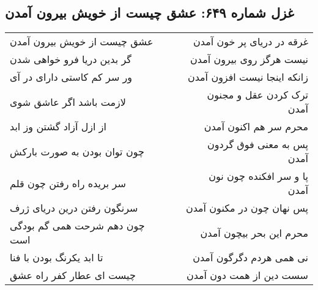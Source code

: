 \begin{center}
\section*{غزل شماره ۶۴۹: عشق چیست از خویش بیرون آمدن}
\label{sec:649}
\begin{longtable}{l p{0.5cm} r}
عشق چیست از خویش بیرون آمدن
&&
غرقه در دریای پر خون آمدن
\\
گر بدین دریا فرو خواهی شدن
&&
نیست هرگز روی بیرون آمدن
\\
ور سر کم کاستی دارای در آی
&&
زانکه اینجا نیست افزون آمدن
\\
لازمت باشد اگر عاشق شوی
&&
ترک کردن عقل و مجنون آمدن
\\
از ازل آزاد گشتن وز ابد
&&
محرم سر هم اکنون آمدن
\\
چون توان بودن به صورت بارکش
&&
پس به معنی فوق گردون آمدن
\\
سر بریده راه رفتن چون قلم
&&
پا و سر افکنده چون نون آمدن
\\
سرنگون رفتن درین دریای ژرف
&&
پس نهان چون در مکنون آمدن
\\
چون دهم شرحت همی گم بودگی است
&&
محرم این بحر بیچون آمدن
\\
تا ابد یکرنگ بودن با فنا
&&
نی همی هردم دگرگون آمدن
\\
چیست ای عطار کفر راه عشق
&&
سست دین از همت دون آمدن
\\
\end{longtable}
\end{center}
